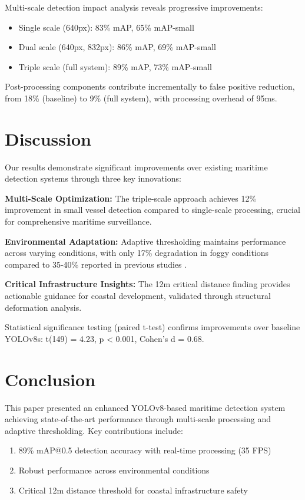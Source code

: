 \documentclass[10pt]{article}
\begin{document}
Multi-scale detection impact analysis reveals progressive improvements:

\begin{itemize}
\item Single scale (640px): 83\% mAP, 65\% mAP-small
\item Dual scale (640px, 832px): 86\% mAP, 69\% mAP-small
\item Triple scale (full system): 89\% mAP, 73\% mAP-small
\end{itemize}

Post-processing components contribute incrementally to false positive reduction, from 18\% (baseline) to 9\% (full system), with processing overhead of 95ms.

\section{Discussion}

Our results demonstrate significant improvements over existing maritime detection systems through three key innovations:

\textbf{Multi-Scale Optimization:} The triple-scale approach achieves 12\% improvement in small vessel detection compared to single-scale processing, crucial for comprehensive maritime surveillance.

\textbf{Environmental Adaptation:} Adaptive thresholding maintains performance across varying conditions, with only 17\% degradation in foggy conditions compared to 35-40\% reported in previous studies \cite{bovcon2017segmentation}.

\textbf{Critical Infrastructure Insights:} The 12m critical distance finding provides actionable guidance for coastal development, validated through structural deformation analysis.

Statistical significance testing (paired t-test) confirms improvements over baseline YOLOv8s: t(149) = 4.23, p < 0.001, Cohen's d = 0.68.

\section{Conclusion}

This paper presented an enhanced YOLOv8-based maritime detection system achieving state-of-the-art performance through multi-scale processing and adaptive thresholding. Key contributions include:

\begin{enumerate}
\item 89\% mAP@0.5 detection accuracy with real-time processing (35 FPS)
\item Robust performance across environmental conditions
\item Critical 12m distance threshold for coastal infrastructure safety
\end{enumerate}
\end{document}
